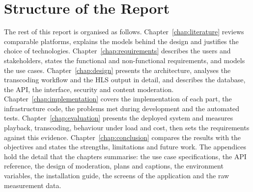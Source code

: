 \section{Structure of the Report}
\label{sec:structure}

The rest of this report is organised as follows. Chapter~\ref{chap:literature} reviews comparable
platforms, explains the models behind the design and justifies the choice of technologies.
Chapter~\ref{chap:requirements} describes the users and stakeholders, states the functional and
non-functional requirements, and models the use cases. Chapter~\ref{chap:design} presents the
architecture, analyses the transcoding workflow and the HLS output in detail, and describes the
database, the API, the interface, security and content moderation.
Chapter~\ref{chap:implementation} covers the implementation of each part, the infrastructure code,
the problems met during development and the automated tests. Chapter~\ref{chap:evaluation}
presents the deployed system and measures playback, transcoding, behaviour under load and cost, then
sets the requirements against this evidence. Chapter~\ref{chap:conclusion} compares the results with
the objectives and states the strengths, limitations and future work. The appendices hold the detail
that the chapters summarise: the use case specifications, the API reference, the design of
moderation, plans and captions, the environment variables, the installation guide, the screens of the
application and the raw measurement data.
